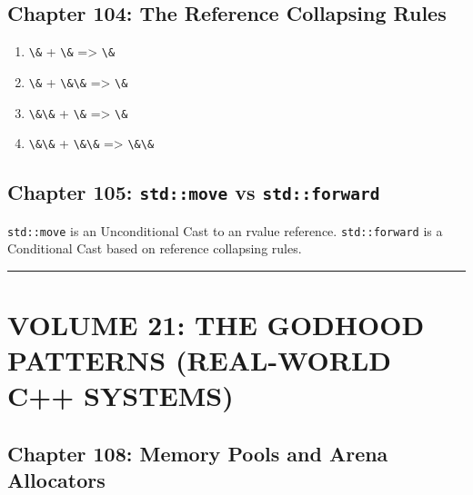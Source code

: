 \hypertarget{chapter-104-the-reference-collapsing-rules}{%
\subsection{Chapter 104: The Reference Collapsing
Rules}\label{chapter-104-the-reference-collapsing-rules}}

\begin{enumerate}
\def\labelenumi{\arabic{enumi}.}
\tightlist
\item
  \passthrough{\lstinline!\&!} + \passthrough{\lstinline!\&!}
  =\textgreater{} \passthrough{\lstinline!\&!}
\item
  \passthrough{\lstinline!\&!} + \passthrough{\lstinline!\&\&!}
  =\textgreater{} \passthrough{\lstinline!\&!}
\item
  \passthrough{\lstinline!\&\&!} + \passthrough{\lstinline!\&!}
  =\textgreater{} \passthrough{\lstinline!\&!}
\item
  \passthrough{\lstinline!\&\&!} + \passthrough{\lstinline!\&\&!}
  =\textgreater{} \passthrough{\lstinline!\&\&!}
\end{enumerate}

\hypertarget{chapter-105-stdmove-vs-stdforward}{%
\subsection{\texorpdfstring{Chapter 105: \texttt{std::move} vs
\texttt{std::forward}}{Chapter 105: std::move vs std::forward}}\label{chapter-105-stdmove-vs-stdforward}}

\passthrough{\lstinline!std::move!} is an Unconditional Cast to an
rvalue reference. \passthrough{\lstinline!std::forward!} is a
Conditional Cast based on reference collapsing rules.

\begin{center}\rule{0.5\linewidth}{0.5pt}\end{center}

\hypertarget{volume-21-the-godhood-patterns-real-world-c-systems}{%
\section{VOLUME 21: THE GODHOOD PATTERNS (REAL-WORLD C++
SYSTEMS)}\label{volume-21-the-godhood-patterns-real-world-c-systems}}

\hypertarget{chapter-108-memory-pools-and-arena-allocators}{%
\subsection{Chapter 108: Memory Pools and Arena
Allocators}\label{chapter-108-memory-pools-and-arena-allocators}}


